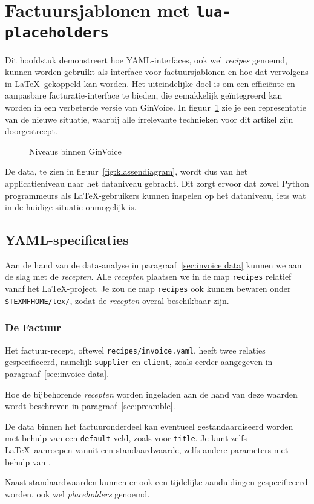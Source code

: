 \section{Factuursjablonen met \texttt{lua-placeholders}}\label{sec:new situation}
Dit hoofdstuk demonstreert hoe YAML-interfaces, ook wel \textit{recipes} genoemd, kunnen worden gebruikt als interface voor factuursjablonen en hoe dat vervolgens in \LaTeX\ gekoppeld kan worden.
Het uiteindelijke doel is om een efficiënte en aanpasbare facturatie-interface te bieden, die gemakkelijk geïntegreerd kan worden in een verbeterde versie van GinVoice.
In figuur~\ref{fig:scope-bd} zie je een representatie van de nieuwe situatie, waarbij alle irrelevante technieken voor dit artikel zijn doorgestreept.
\begin{figure}[!ht]
    \centering
    
    \caption{Niveaus binnen GinVoice}\label{fig:scope-bd}
\end{figure}
De data, te zien in figuur~\ref{fig:klassendiagram}, wordt dus van het applicatieniveau naar het dataniveau gebracht.
Dit zorgt ervoor dat zowel Python programmeurs als \LaTeX-gebruikers kunnen inspelen op het dataniveau, iets wat in de huidige situatie onmogelijk is.

\subsection{YAML-specificaties}
Aan de hand van de data-analyse in paragraaf~\ref{sec:invoice data} kunnen we aan de slag met de \textit{recepten}.
Alle \textit{recepten} plaatsen we in de map \texttt{recipes} relatief vanaf het \LaTeX-project.
Je zou de map \texttt{recipes} ook kunnen bewaren onder \texttt{\$TEXMFHOME/tex/}, zodat de \textit{recepten} overal beschikbaar zijn.

\subsubsection{De Factuur}
Het factuur-recept, oftewel \texttt{recipes/invoice.yaml}, heeft twee relaties gespecificeerd, namelijk \texttt{supplier} en \texttt{client}, zoals eerder aangegeven in paragraaf~\ref{sec:invoice data}.

Hoe de bijbehorende \textit{recepten} worden ingeladen aan de hand van deze waarden wordt beschreven in paragraaf~\ref{sec:preamble}.

De data binnen het factuuronderdeel kan eventueel gestandaardiseerd worden met behulp van een \texttt{default} veld, zoals voor \texttt{title}.
Je kunt zelfs \LaTeX\ aanroepen vanuit een standaardwaarde, zelfs andere parameters met behulp van .

Naast standaardwaarden kunnen er ook een tijdelijke aanduidingen gespecificeerd worden, ook wel \textit{placeholders} genoemd.

